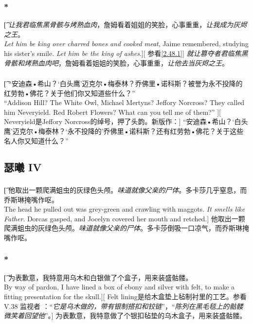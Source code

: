 \documentclass[12pt,a4paper]{article}
\begin{document}
\subsubsection{\color{red}*}\label{4.16.2}\t[
	\emph{让我君临焦黑骨骸与烤熟血肉}，詹姆看着姐姐的笑脸，心事重重，\emph{让我成为灰烬之王}。\\
	\emph{Let him be king over charred bones and cooked meat}, Jaime remembered, studying his sister's smile. \emph{Let him be the king of ashes}.][
	参看\ref{2.48.1}]
\emph{	就让篡夺者君临焦黑骨骸和烤熟血肉吧}，詹姆看着姐姐的笑脸，心事重重，\emph{让他去当灰烬之王}。
	
\subsubsection{}\t[
	“安迪森•希山？‘白头鹰’迈克尔•梅泰林？乔佛里•诺科斯？被誉为永不投降的红劳勃•佛花？关于他们你又知道些什么？” \\
	“Addison Hill? The White Owl, Michael Mertyns? Jeffory Norcross? They called him Neveryield. Red Robert Flowers? What can you tell me of them?” ][
	Neveryield是Jeffory Norcross的绰号，押了头韵。新版作：]
	“安迪森•希山？‘白头鹰’迈克尔•梅泰林？‘永不投降的’乔佛里•诺科斯？还有红劳勃•佛花？关于这些名人你又知道什么？”
	
\subsection{瑟曦 IV}
\subsubsection{}\t[
	他取出一颗爬满蛆虫的灰绿色头颅。\emph{味道就像父亲的尸体}。多卡莎几乎窒息，而乔斯琳掩嘴作呕。\\
	The head he pulled out was grey-green and crawling with maggots. \emph{It smells like Father}. Dorcas gasped, and Jocelyn covered her mouth and retched.]
	他取出一颗爬满蛆虫的灰绿色头颅。\emph{味道就像父亲的尸体}。多卡莎倒吸一口凉气，而乔斯琳掩嘴作呕。
	
\subsubsection{\color{red}*}\t[
	为表歉意，我特意用乌木和白银做了个盒子，用来装盛骷髅。\\
	By way of pardon, I have lined a box of ebony and silver with felt, to make a fitting presentation for the skull.][
	Felt lining是给木盒垫上毡制衬里的工艺。参看V.38 监视者 ：“\emph{它是乌木做的，带有银制搭扣和铰链}”，“\emph{陈列在黑毛毯上的骷髅微笑着回望他}”。]
	为表歉意，我特意做了个银扣毡垫的乌木盒子，用来装盛骷髅。
	
\end{document}
